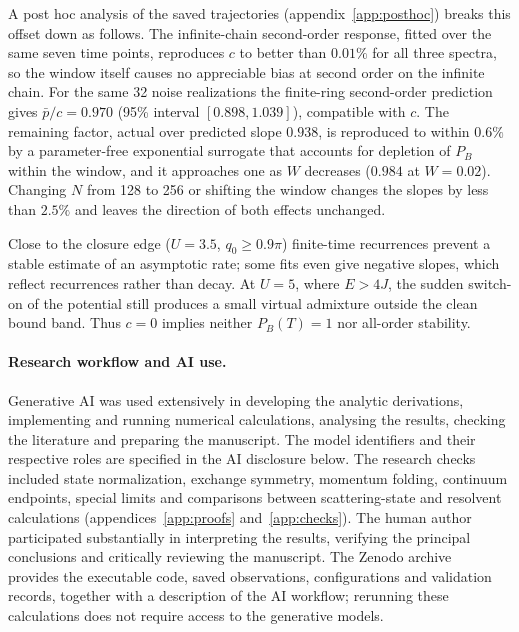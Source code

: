 \documentclass[12pt,a4paper]{article}
\theoremstyle{remark}
\begin{document}
A post hoc analysis of the saved trajectories (appendix~\ref{app:posthoc}) breaks this offset down as follows. The infinite-chain second-order response, fitted over the same seven time points, reproduces $c$ to better than $0.01\%$ for all three spectra, so the window itself causes no appreciable bias at second order on the infinite chain. For the same 32 noise realizations the finite-ring second-order prediction gives $\bar p/c=0.970$ (95\% interval $[0.898,1.039]$), compatible with $c$. The remaining factor, actual over predicted slope $0.938$, is reproduced to within $0.6\%$ by a parameter-free exponential surrogate that accounts for depletion of $P_B$ within the window, and it approaches one as $W$ decreases ($0.984$ at $W=0.02$). Changing $N$ from 128 to 256 or shifting the window changes the slopes by less than $2.5\%$ and leaves the direction of both effects unchanged.

Close to the closure edge ($U=3.5$, $q_0\ge0.9\pi$) finite-time recurrences prevent a stable estimate of an asymptotic rate; some fits even give negative slopes, which reflect recurrences rather than decay. At $U=5$, where $E>4J$, the sudden switch-on of the potential still produces a small virtual admixture outside the clean bound band. Thus $c=0$ implies neither $P_B(T)=1$ nor all-order stability.

\paragraph{Research workflow and AI use.}
Generative AI was used extensively in developing the analytic derivations, implementing and running numerical calculations, analysing the results, checking the literature and preparing the manuscript. The model identifiers and their respective roles are specified in the AI disclosure below. The research checks included state normalization, exchange symmetry, momentum folding, continuum endpoints, special limits and comparisons between scattering-state and resolvent calculations (appendices~\ref{app:proofs} and~\ref{app:checks}). The human author participated substantially in interpreting the results, verifying the principal conclusions and critically reviewing the manuscript. The Zenodo archive~\cite{JinZenodo2026} provides the executable code, saved observations, configurations and validation records, together with a description of the AI workflow; rerunning these calculations does not require access to the generative models.

\end{document}
